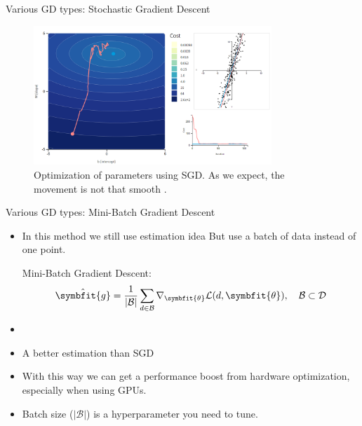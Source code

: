\begin{frame}{Various GD types: Stochastic Gradient Descent}
	\begin{figure}[H]
		\centering
		\includegraphics[width=0.8\textwidth]{Images/sgd.png}
		\caption{Optimization of parameters using SGD. As we expect, the movement is not that smooth \cite{katanforoosh-kunin-opt}.}
	\end{figure} 
\end{frame}

\begin{frame}{Various GD types: Mini-Batch Gradient Descent}
	\begin{itemize}
		\item In this method we still use estimation idea But use {\color{newcolor}a batch of data} instead of one point.
		\begin{block}{Mini-Batch Gradient Descent:}
			\[
			\hat{\symbfit{g}} = \frac{1}{|\mathcal{B}|} \sum_{d\in\mathcal{B}} \nabla_{\symbfit{\theta}} \mathcal{L}(d, \symbfit{\theta}), \quad \mathcal{B} \subset \mathcal{D}
			\]
		\end{block}
		\item[]
		\item A better estimation than SGD
		\item With this way we can get a performance boost from hardware optimization, especially when using GPUs.
		\item Batch size ($|\mathcal{B}|$) is a hyperparameter you need to tune.
	\end{itemize}
\end{frame}

